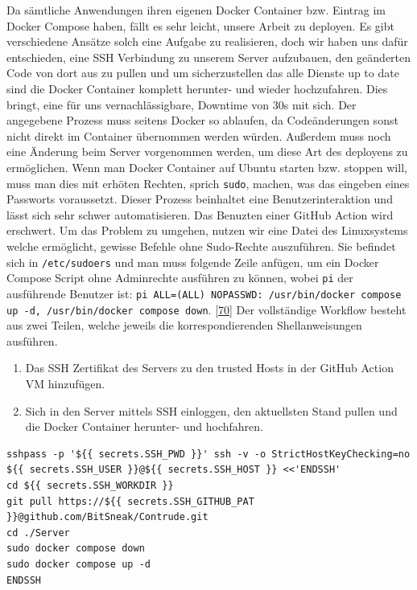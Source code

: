 \documentclass[
    headings=optiontotocandhead,%
    twoside,
    numbers=noenddot,%
    12pt, %
    titlepage, %
    parskip=full, %
    listof=leveldown, 
    numbers=noenddot, %
    a4paper,DIV=14,
    BCOR=15mm,
]{scrbook}
\newcommand{\passthrough}[1]{#1}
\providecommand{\tightlist}{%
  \setlength{\itemsep}{0pt}\setlength{\parskip}{0pt}}
\begin{document}
Da sämtliche Anwendungen ihren eigenen Docker Container bzw. Eintrag im
Docker Compose haben, fällt es sehr leicht, unsere Arbeit zu deployen.
Es gibt verschiedene Ansätze solch eine Aufgabe zu realisieren, doch wir
haben uns dafür entschieden, eine SSH Verbindung zu unserem Server
aufzubauen, den geänderten Code von dort aus zu pullen und um
sicherzustellen das alle Dienste up to date sind die Docker Container
komplett herunter- und wieder hochzufahren. Dies bringt, eine für uns
vernachlässigbare, Downtime von 30s mit sich. Der angegebene Prozess
muss seitens Docker so ablaufen, da Codeänderungen sonst nicht direkt im
Container übernommen werden würden. Außerdem muss noch eine Änderung
beim Server vorgenommen werden, um diese Art des deployens zu
ermöglichen. Wenn man Docker Container auf Ubuntu starten bzw. stoppen
will, muss man dies mit erhöten Rechten, sprich
\passthrough{\lstinline!sudo!}, machen, was das eingeben eines Passworts
voraussetzt. Dieser Prozess beinhaltet eine Benutzerinteraktion und
lässt sich sehr schwer automatisieren. Das Benuzten einer GitHub Action
wird erschwert. Um das Problem zu umgehen, nutzen wir eine Datei des
Linuxsystems welche ermöglicht, gewisse Befehle ohne Sudo-Rechte
auszuführen. Sie befindet sich in \passthrough{\lstinline!/etc/sudoers!}
und man muss folgende Zeile anfügen, um ein Docker Compose Script ohne
Adminrechte ausführen zu können, wobei \passthrough{\lstinline!pi!} der
ausführende Benutzer ist:
\passthrough{\lstinline!pi ALL=(ALL) NOPASSWD: /usr/bin/docker compose up -d, /usr/bin/docker compose down!}.
{[}\protect\hyperlink{ref-sudo-no-pass}{70}{]} Der vollständige Workflow
besteht aus zwei Teilen, welche jeweils die korrespondierenden
Shellanweisungen ausführen.

\begin{enumerate}
\def\labelenumi{\arabic{enumi}.}
\tightlist
\item
  Das SSH Zertifikat des Servers zu den trusted Hosts in der GitHub
  Action VM hinzufügen.
\item
  Sich in den Server mittels SSH einloggen, den aktuellsten Stand pullen
  und die Docker Container herunter- und hochfahren.
\end{enumerate}

\begin{lstlisting}[caption={Updaten der Docker Container am Server}]
sshpass -p '${{ secrets.SSH_PWD }}' ssh -v -o StrictHostKeyChecking=no ${{ secrets.SSH_USER }}@${{ secrets.SSH_HOST }} <<'ENDSSH'
cd ${{ secrets.SSH_WORKDIR }}
git pull https://${{ secrets.SSH_GITHUB_PAT }}@github.com/BitSneak/Contrude.git
cd ./Server
sudo docker compose down
sudo docker compose up -d
ENDSSH
\end{lstlisting}
\end{document}
